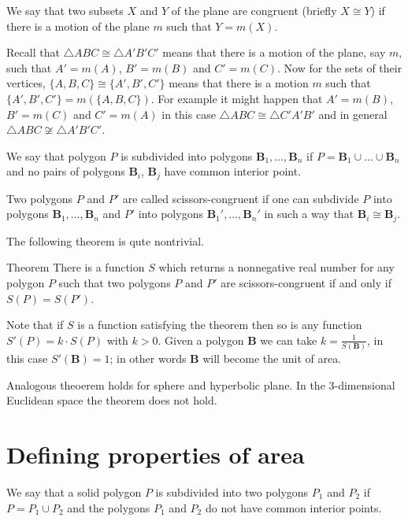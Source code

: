 We say that two subsets $X$ and $Y$ 
of the plane are congruent (briefly $X\cong Y$)
if there is a motion of the plane $m$
such that $Y=m(X)$.

Recall that $\triangle ABC\cong\triangle A'B'C'$ means that there is a motion of the plane, say $m$, 
such that $A'=m(A)$, $B'=m(B)$ and $C'=m(C)$.
Now for the sets of their vertices,
$\{A,B,C\}\cong\{A',B',C'\}$ means that there is a motion $m$ such that $\{A',B',C'\}=m(\{A,B,C\})$.
For example it might happen that $A'=m(B)$, $B'=m(C)$ and $C'=m(A)$
in this case $\triangle ABC\cong\triangle C'A'B'$ and in general $\triangle ABC\not\cong\triangle A'B'C'$.

We say that polygon $P$ is subdivided into polygons $\bm{B}_1,\dots, \bm{B}_n$
if $P=\bm{B}_1\cup\dots\cup \bm{B}_n$ and no pairs of polygons $\bm{B}_i$, $\bm{B}_j$ have common interior point.

Two polygons $P$ and $P'$ are called scissors-congruent
if one can subdivide $P$ into polygons $\bm{B}_1,\dots, \bm{B}_n$
and $P'$ into polygons $\bm{B}_1',\dots, \bm{B}_n'$
in such a way that $\bm{B}_i\cong \bm{B}_j$.



The following theorem is qute nontrivial.

\begin{thm}{Theorem}
There is a function $S$ which returns a nonnegative real number for any polygon $P$ such that two polygons $P$ and $P'$ are scissors-congruent
if and only if $S(P)=S(P')$.
\end{thm}

Note that if $S$ is a function satisfying the theorem then so is any function $S'(P)=k\cdot S(P)$ with $k>0$.
Given a polygon $\bm{B}$ we can take $k=\tfrac{1}{S(\bm{B})}$,
in this case $S'(\bm{B})=1$;
in other words $\bm{B}$ will become the unit of area.

Analogous theoerem holds for sphere and hyperbolic plane.
In the $3$-dimensional Euclidean space the theorem does not hold.


\section*{Defining properties of area}

We say that a solid polygon $P$ is subdivided 
into two polygons $P_1$ and $P_2$ 
if $P=P_1\cup P_2$ 
and the polygons $P_1$ and $P_2$ do not have common interior points. 

